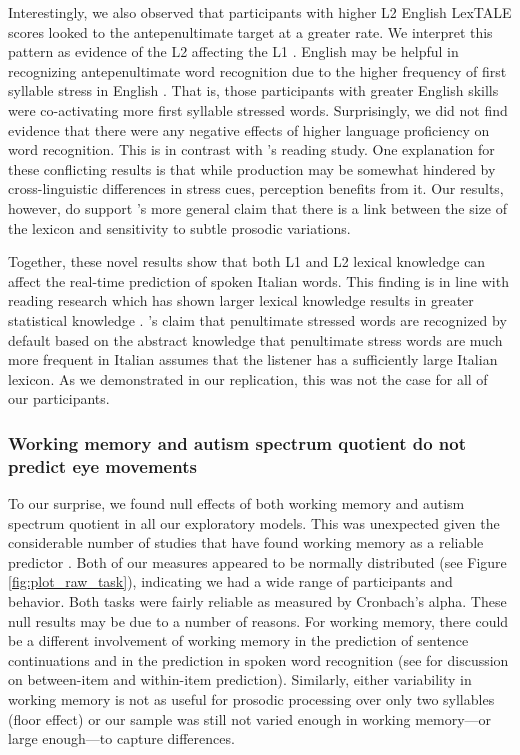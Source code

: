 Interestingly, we also observed that participants with higher L2 English LexTALE scores looked to the antepenultimate target at a greater rate. We interpret this pattern as evidence of the L2 affecting the L1 \citep{marian2003competing, dijkstra2002architecture}. English may be helpful in recognizing antepenultimate word recognition due to the higher frequency of first syllable stress in English \citep{cutler2007dutch}. That is, those participants with greater English skills were co-activating more first syllable stressed words. Surprisingly, we did not find evidence that there were any negative effects of higher language proficiency on word recognition. This is in contrast with \cite{primativo2013bilingual}'s reading study. One explanation for these conflicting results is that while production may be somewhat hindered by cross-linguistic differences in stress cues, perception benefits from it. Our results, however, do support \cite{primativo2013bilingual}'s more general claim that there is a link between the size of the lexicon and sensitivity to subtle prosodic variations.

Together, these novel results show that both L1 and L2 lexical knowledge can affect the real-time prediction of spoken Italian words. This finding is in line with reading research which has shown larger lexical knowledge results in greater statistical knowledge \citep{mirman2008attractor, kuperman2013reassessing}.  \cite{Sulpizio_McQueen_2012}'s claim that penultimate stressed words are recognized by default based on the abstract knowledge that penultimate stress words are much more frequent in Italian assumes that the listener has a sufficiently large Italian lexicon. As we demonstrated in our replication, this was not the case for all of our participants.


\subsubsection{Working memory and autism spectrum quotient do not predict eye movements}
To our surprise, we found null effects of both working memory and autism spectrum quotient in all our exploratory models. This was unexpected given the considerable number of studies that have found working memory as a reliable predictor \citep{Traxler2009, Huettig2016}. Both of our measures appeared to be normally distributed (see Figure \ref{fig:plot_raw_task}), indicating we had a wide range of participants and behavior. Both tasks were fairly reliable as measured by Cronbach's alpha. These null results may be due to a number of reasons. For working memory, there could be a different involvement of working memory in the prediction of sentence continuations and in the prediction in spoken word recognition (see \cite{huettig2022parallel} for discussion on between-item and within-item prediction). Similarly, either variability in working memory is not as useful for prosodic processing over only two syllables (floor effect) or our sample was still not varied enough in working memory---or large enough---to capture differences. 


